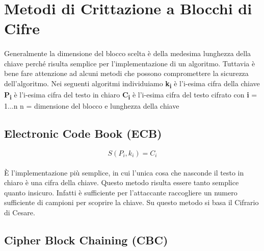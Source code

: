 \documentclass{article}
\begin{document}
	\section{Metodi di Crittazione a Blocchi di Cifre}

		\paragraph{}
		Generalmente la dimensione del blocco scelta è della medesima lunghezza della chiave perché risulta semplice per l'implementazione di un algoritmo. Tuttavia è bene fare attenzione ad alcuni metodi che possono compromettere la sicurezza dell'algoritmo. Nei seguenti algoritmi individuiamo \newline \newline
		\textbf{k\textsubscript{i}} è l'i-esima cifra della chiave \newline
		\textbf{P\textsubscript{i}} è l'i-esima cifra del testo in chiaro \newline 
		\textbf{C\textsubscript{i}} è l'i-esima cifra del testo cifrato \newline \newline
		con \newline \newline
		\textbf{i} = 1...n \newline
		n = dimensione del blocco e lunghezza della chiave

		\subsection{Electronic Code Book (ECB)}

			\begin{equation*}
				S(P_i,k_i) = C_i
			\end{equation*}
			\paragraph{}
			È l'implementazione più semplice, in cui l'unica cosa che nasconde il testo in chiaro è una cifra della chiave. Questo metodo risulta essere tanto semplice quanto insicuro. Infatti è sufficiente per l'attaccante raccogliere un numero sufficiente di campioni per scoprire la chiave. Su questo metodo si basa il Cifrario di Cesare.

		\subsection{Cipher Block Chaining (CBC)}
\end{document}

